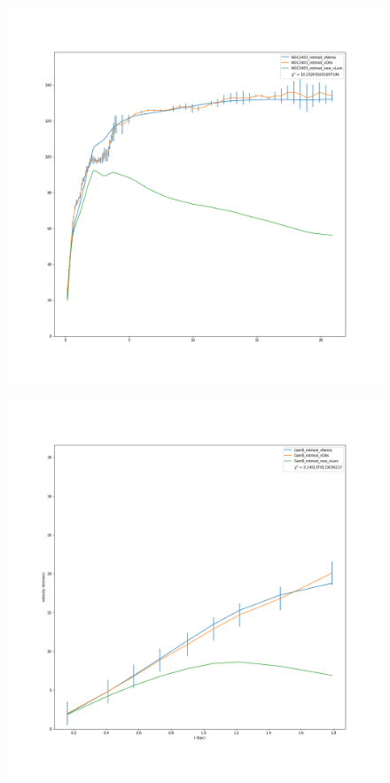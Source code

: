 \documentclass[reprint,%
 amsmath,amssymb,
 aps,
]{revtex4-1}
\begin{document}
\begin{figure}
\centering
\begin{minipage}{.5\textwidth}
  \centering
  \includegraphics[width=.95\linewidth]{figures/NGC2403_rotmod_XueSofue.png}
  \label{fig:test1}
\end{minipage}%
\begin{minipage}{.5\textwidth}
  \centering
  \includegraphics[width=.95\linewidth]{figures/CamB_rotmod_XueSofue.png}

\end{minipage}
\end{figure}
\end{document}
